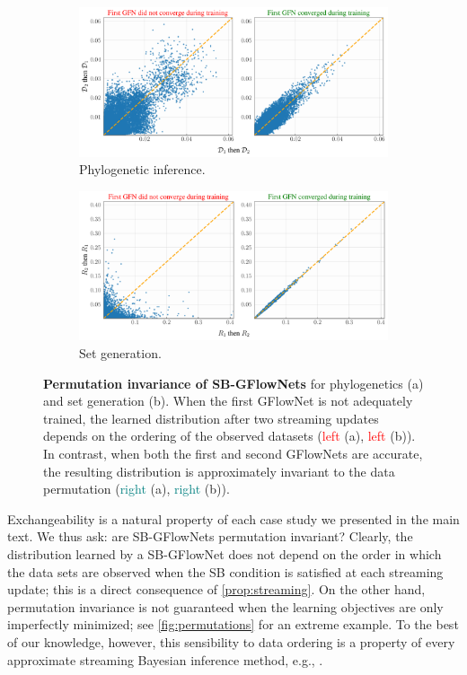 \documentclass{article}
\theoremstyle{plain}
\theoremstyle{definition}
\theoremstyle{remark}
\theoremstyle{remark}
\begin{document}
\begin{figure}[h!]
    \centering
    \begin{subfigure}{.4\textwidth} 
        \includegraphics[width=\linewidth]{figures_rebuttal/streaming_eval_permutation.pdf}
        \caption{Phylogenetic inference.}
    \end{subfigure}
    \begin{subfigure}{.4\textwidth} 
        \includegraphics[width=\linewidth]{figures_rebuttal/streaming_eval_permutation_sets.pdf}
        \caption{Set generation.} 
    \end{subfigure}
    \caption{\textbf{Permutation invariance of SB-GFlowNets} for phylogenetics (a) and set generation (b). When the first GFlowNet is not adequately trained, the learned distribution after two streaming updates depends on the ordering of the observed datasets (\textcolor{red}{left} (a), \textcolor{red}{left} (b)). In contrast, when both the first and second GFlowNets are accurate, the resulting distribution is approximately invariant to the data permutation (\textcolor{teal}{right} (a), \textcolor{teal}{right} (b)). }
    \label{fig:permutations}
\end{figure}

Exchangeability is a natural property of each case study we presented in the main text. 
We thus ask: are SB-GFlowNets permutation invariant? 
Clearly, the distribution learned by a SB-GFlowNet does not depend on the order in which the data sets are observed when the SB condition is satisfied at each streaming update; this is a direct consequence of \autoref{prop:streaming}. On the other hand, permutation invariance is not guaranteed when the learning objectives are only imperfectly minimized; see \autoref{fig:permutations} for an extreme example. 
To the best of our knowledge, however, this sensibility to data ordering is a property of every approximate streaming Bayesian inference method, e.g., \cite{Broderick13, Dinh2017}. 
\end{document}
